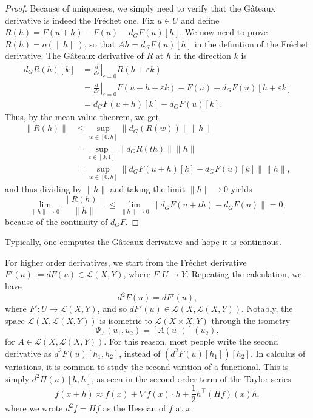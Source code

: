 \documentclass{article}
\begin{document}
\begin{proof}
    Because of uniqueness, we simply need to verify that the Gâteaux derivative is indeed the Fréchet one. Fix $u\in U$ and define $R(h) = F(u+h) - F(u) - d_G F(u)[h]$. We now need to prove $R(h)=o(\|h\|)$, so that $Ah=d_G F(u)[h]$ in the definition of the Fréchet derivative. The Gâteaux derivative of $R$ at $h$ in the direction $k$ is
    \begin{align*}
        d_G R(h)[k] &= \left.\frac{d}{d\varepsilon}\right|_{\varepsilon = 0} R(h+\varepsilon k) \\
        & = \left.\frac{d}{d\varepsilon}\right|_{\varepsilon = 0} F(u+h+\varepsilon k) - F(u) - d_G F(u)[h + \varepsilon k] \\
        & = d_G F(u+h)[k] - d_G F(u)[k].
    \end{align*}    
    Thus, by the mean value theorem, we get
    \begin{align*}
        \|R(h)\| &\leq \sup_{w\in [0,h]} \|d_G(R(w))\| \|h\|\\
        &=    \sup_{t\in [0,1]} \|d_G R(th)\| \|h\|\\
        &=    \sup_{w\in [0,h]} \|d_G F(u+h)[k] - d_G F(u)[k]\| \|h\|,
    \end{align*}
    and thus dividing by $\|h\|$ and taking the limit $\|h\|\to 0$ yields
    \begin{equation*}
        \lim_{\|h\|\to 0} \frac{\|R(h)\|}{\|h\|} \leq \lim_{\|h\|\to 0} \|d_G F(u+th) - d_G F(u)\| = 0,
    \end{equation*}    
    because of the continuity of $d_G F$.
\end{proof}
Typically, one computes the Gâteaux derivative and hope it is continuous.


For higher order derivatives, we start from the Fréchet derivative $F'(u) := dF(u)\in \mathcal{L}(X,Y)$, where $F:U\to Y$. Repeating the calculation, we have
\begin{equation*}
    d^2 F(u) = dF'(u), 
\end{equation*} 
where $F': U\to \mathcal{L}(X,Y)$, and so $dF'(u) \in \mathcal{L}(X, \mathcal{L}(X,Y))$. Notably, the space $\mathcal{L}(X, \mathcal{L}(X,Y))$ is isometric to $\mathcal{L}(X\times X,Y)$ through the isometry
\begin{equation*}
    \Psi_A(u_1,u_2) = [A(u_1)](u_2),
\end{equation*} 
for $A\in \mathcal{L}(X,\mathcal{L}(X,Y))$. For this reason, most people write the second derivative as $d^2 F(u) [h_1,h_2]$, instead of $(d^2 F(u)[h_1])[h_2]$. In calculus of variations, it is common to study the second varition of a functional. This is simply $d^2 \Pi(u)[h,h]$, as seen in the second order term of the Taylor series
\begin{equation*}
    f(x+h)\approx f(x) + \nabla f(x) \cdot h + \frac{1}{2} h^\top (Hf)(x) h,
\end{equation*} 
where we wrote $d^2 f = Hf$ as the Hessian of $f$ at $x$.
\end{document}
